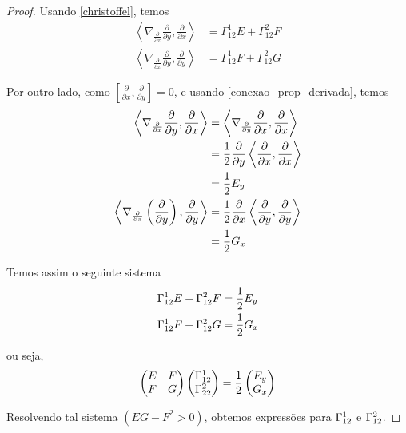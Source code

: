 \begin{proof}
	Usando \eqref{christoffel}, temos
	\begin{align*}
		\left\langle \nabla_{\frac{\partial}{\partial x}} \frac{\partial}{\partial y}, \frac{\partial}{\partial x} \right\rangle &= \Gamma_{12}^1 E + \Gamma_{12}^2 F\\
		\left\langle \nabla_{\frac{\partial}{\partial x}} \frac{\partial}{\partial y}, \frac{\partial}{\partial y} \right\rangle &= \Gamma_{12}^1 F + \Gamma_{12}^2 G
	\end{align*}
	
	Por outro lado, como $\left[ \frac{\partial}{\partial x}, \frac{\partial}{\partial y} \right] = 0$, e usando \eqref{conexao_prop_derivada}, temos
	\begin{align*}
		\left\langle \nabla_{\frac{\partial}{\partial x}} \frac{\partial}{\partial y}, \frac{\partial}{\partial x} \right\rangle &= \left\langle \nabla_{\frac{\partial}{\partial y}} \frac{\partial}{\partial x}, \frac{\partial}{\partial x} \right\rangle\\
		&= \frac{1}{2}	\frac{\partial}{\partial y} \left\langle \frac{\partial}{\partial x},\frac{\partial}{\partial x} \right\rangle\\
		&= \frac{1}{2} E_y\\
		\left\langle \nabla_{\frac{\partial}{\partial x}} \left( \frac{\partial}{\partial y} \right),\frac{\partial}{\partial y} \right\rangle &= \frac{1}{2} \frac{\partial}{\partial x} \left\langle \frac{\partial}{\partial y},\frac{\partial}{\partial y} \right\rangle\\
		&= \frac{1}{2} G_x
	\end{align*}
	
	Temos assim o seguinte sistema
	\begin{align*}
		\Gamma_{12}^{1} E + \Gamma_{12}^{2} F &= \frac{1}{2} E_y\\
		\Gamma_{12}^{1} F + \Gamma_{12}^{2} G &= \frac{1}{2} G_x
	\end{align*}
	
	ou seja,
	\begin{equation*}
		\left( \begin{matrix}
		E & F\\
		F & G
		\end{matrix} \right) \left( \begin{matrix}
		\Gamma_{12}^{1}\\
		\Gamma_{22}^{2}
		\end{matrix} \right) = \frac{1}{2} \left( \begin{matrix}
		E_y\\
		G_x
		\end{matrix} \right)
	\end{equation*}
	
	Resolvendo tal sistema $(EG-F^2 > 0)$, obtemos expressões para $\Gamma_{12}^{1}$ e $\Gamma_{12}^{2}$.
\end{proof}

